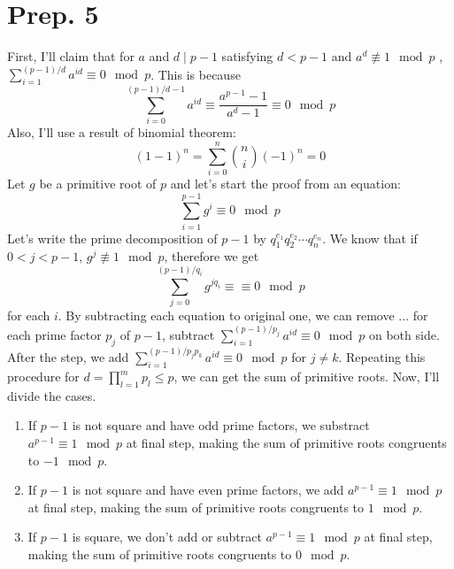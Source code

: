 \documentclass[12pt]{article}
\newenvironment{problem}[2][Problem]{\begin{trivlist}
\item[\hskip \labelsep {\bfseries #1}\hskip \labelsep {\bfseries #2.}]}{\end{trivlist}}
\begin{document}




\section{Prep. 5}
\begin{problem}{1}
\end{problem}
First, I'll claim that for $a$ and $d\mid p-1$ satisfying $d<p-1$ and $a^d\not\equiv 1 \mod p$ , $\sum\limits_{i=1}^{(p-1)/d} a^{id}\equiv 0\mod p$. This is because
\begin{equation*}
    \sum\limits_{i=0}^{(p-1)/d-1} a^{id}\equiv \frac{a^{p-1}-1}{a^d-1}\equiv 0 \mod p
\end{equation*}
Also, I'll use a result of binomial theorem:
\begin{equation*}
    (1-1)^n=\sum\limits_{i=0}^n \binom{n}{i} (-1)^n=0
\end{equation*}
Let $g$ be a primitive root of $p$ and let's start the proof from an equation:
\begin{equation*}
    \sum\limits_{i=1}^{p-1} g^i\equiv 0\mod p
\end{equation*}
Let's write the prime decomposition of $p-1$ by $q_1^{e_1}q_2^{e_2}\cdots q_n^{e_n}$. We know that if $0<j<p-1$, $g^j\not\equiv 1\mod p$, therefore we get
\begin{equation*}
    \sum\limits_{j=0}^{(p-1)/q_i} g^{jq_i}\equiv \equiv 0 \mod p
\end{equation*}
for each $i$. By subtracting each equation to original one, we can remove ...
for each prime factor $p_j$ of $p-1$, subtract $\sum\limits_{i=1}^{(p-1)/p_j} a^{id}\equiv 0\mod p$ on both side. After the step, we add $\sum\limits_{i=1}^{(p-1)/p_j p_k} a^{id}\equiv 0\mod p$ for $j\neq k$. Repeating this procedure for $d=\prod\limits_{l=1}^{m} p_l\leq p$, we can get the sum of primitive roots. Now, I'll divide the cases.
\begin{enumerate}
    \item If $p-1$ is not square and have odd prime factors, we substract $a^{p-1}\equiv 1\mod p$ at final step, making the sum of primitive roots congruents to $-1\mod p$.
    \item If $p-1$ is not square and have even prime factors, we add $a^{p-1}\equiv 1\mod p$ at final step, making the sum of primitive roots congruents to $1\mod p$.
    \item If $p-1$ is square, we don't add or subtract $a^{p-1}\equiv 1 \mod p$ at final step, making the sum of primitive roots congruents to $0\mod p$.
\end{enumerate}
\end{document}
